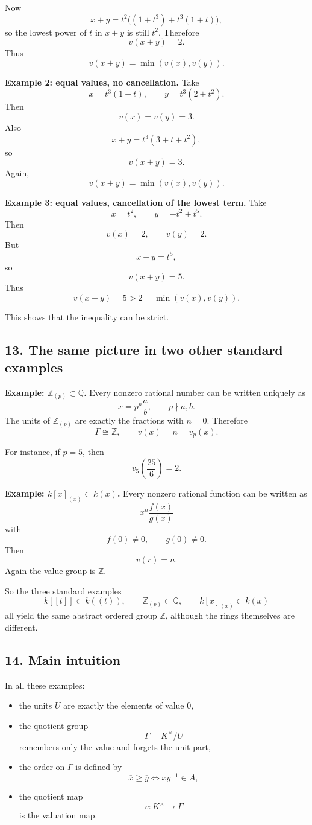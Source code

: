 \documentclass[12pt,a4paper]{article}
\theoremstyle{notespace}
\begin{document}
Now
\[
x+y=t^2\bigl((1+t^3)+t^3(1+t)\bigr),
\]
so the lowest power of \(t\) in \(x+y\) is still \(t^2\). Therefore
\[
v(x+y)=2.
\]
Thus
\[
v(x+y)=\min(v(x),v(y)).
\]

\textbf{Example 2: equal values, no cancellation.}
Take
\[
x=t^3(1+t),
\qquad
y=t^3(2+t^2).
\]
Then
\[
v(x)=v(y)=3.
\]
Also
\[
x+y=t^3(3+t+t^2),
\]
so
\[
v(x+y)=3.
\]
Again,
\[
v(x+y)=\min(v(x),v(y)).
\]

\textbf{Example 3: equal values, cancellation of the lowest term.}
Take
\[
x=t^2,
\qquad
y=-t^2+t^5.
\]
Then
\[
v(x)=2,
\qquad
v(y)=2.
\]
But
\[
x+y=t^5,
\]
so
\[
v(x+y)=5.
\]
Thus
\[
v(x+y)=5 > 2=\min(v(x),v(y)).
\]

This shows that the inequality can be strict.

\subsection{13. The same picture in two other standard examples}

\textbf{Example: \(\mathbb Z_{(p)}\subset \mathbb Q\).}
Every nonzero rational number can be written uniquely as
\[
x=p^n\frac ab,
\qquad
p\nmid a,b.
\]
The units of \(\mathbb Z_{(p)}\) are exactly the fractions with \(n=0\). Therefore
\[
\Gamma\cong \mathbb Z,
\qquad
v(x)=n=v_p(x).
\]

For instance, if \(p=5\), then
\[
v_5\!\left(\frac{25}{6}\right)=2.
\]

\textbf{Example: \(k[x]_{(x)}\subset k(x)\).}
Every nonzero rational function can be written as
\[
x^n\frac{f(x)}{g(x)}
\]
with
\[
f(0)\neq 0,
\qquad
g(0)\neq 0.
\]
Then
\[
v(r)=n.
\]
Again the value group is \(\mathbb Z\).

So the three standard examples
\[
k[[t]]\subset k((t)),
\qquad
\mathbb Z_{(p)}\subset \mathbb Q,
\qquad
k[x]_{(x)}\subset k(x)
\]
all yield the same abstract ordered group \(\mathbb Z\), although the rings themselves are different.

\subsection{14. Main intuition}

In all these examples:
\begin{itemize}
	\item the units \(U\) are exactly the elements of value \(0\),
	\item the quotient group
	\[
	\Gamma=K^\times/U
	\]
	remembers only the value and forgets the unit part,
	\item the order on \(\Gamma\) is defined by
	\[
	\overline x \ge \overline y
	\iff
	xy^{-1}\in A,
	\]
	\item the quotient map
	\[
	v:K^\times\to \Gamma
	\]
	is the valuation map.
\end{itemize}
\end{document}
